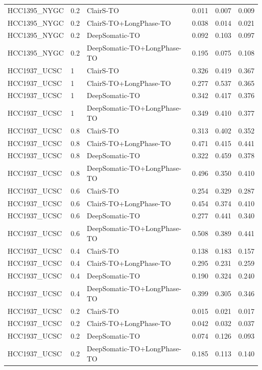 \documentclass[pdflatex,sn-nature]{sn-jnl}
\begin{document}
{\begin{longtable}{@{}lllccc@{}}
  HCC1395\_NYGC & 0.2 & ClairS-TO & 0.011 & 0.007 & 0.009 \\
  HCC1395\_NYGC & 0.2 & ClairS-TO+LongPhase-TO & 0.038 & 0.014 & 0.021 \\
  HCC1395\_NYGC & 0.2 & DeepSomatic-TO & 0.092 & 0.103 & 0.097 \\
  HCC1395\_NYGC & 0.2 & DeepSomatic-TO+LongPhase-TO & 0.195 & 0.075 & 0.108 \\
  HCC1937\_UCSC & 1 & ClairS-TO & 0.326 & 0.419 & 0.367 \\
  HCC1937\_UCSC & 1 & ClairS-TO+LongPhase-TO & 0.277 & 0.537 & 0.365 \\
  HCC1937\_UCSC & 1 & DeepSomatic-TO & 0.342 & 0.417 & 0.376 \\
  HCC1937\_UCSC & 1 & DeepSomatic-TO+LongPhase-TO & 0.349 & 0.410 & 0.377 \\
  HCC1937\_UCSC & 0.8 & ClairS-TO & 0.313 & 0.402 & 0.352 \\
  HCC1937\_UCSC & 0.8 & ClairS-TO+LongPhase-TO & 0.471 & 0.415 & 0.441 \\
  HCC1937\_UCSC & 0.8 & DeepSomatic-TO & 0.322 & 0.459 & 0.378 \\
  HCC1937\_UCSC & 0.8 & DeepSomatic-TO+LongPhase-TO & 0.496 & 0.350 & 0.410 \\
  HCC1937\_UCSC & 0.6 & ClairS-TO & 0.254 & 0.329 & 0.287 \\
  HCC1937\_UCSC & 0.6 & ClairS-TO+LongPhase-TO & 0.454 & 0.374 & 0.410 \\
  HCC1937\_UCSC & 0.6 & DeepSomatic-TO & 0.277 & 0.441 & 0.340 \\
  HCC1937\_UCSC & 0.6 & DeepSomatic-TO+LongPhase-TO & 0.508 & 0.389 & 0.441 \\
  HCC1937\_UCSC & 0.4 & ClairS-TO & 0.138 & 0.183 & 0.157 \\
  HCC1937\_UCSC & 0.4 & ClairS-TO+LongPhase-TO & 0.295 & 0.231 & 0.259 \\
  HCC1937\_UCSC & 0.4 & DeepSomatic-TO & 0.190 & 0.324 & 0.240 \\
  HCC1937\_UCSC & 0.4 & DeepSomatic-TO+LongPhase-TO & 0.399 & 0.305 & 0.346 \\
  HCC1937\_UCSC & 0.2 & ClairS-TO & 0.015 & 0.021 & 0.017 \\
  HCC1937\_UCSC & 0.2 & ClairS-TO+LongPhase-TO & 0.042 & 0.032 & 0.037 \\
  HCC1937\_UCSC & 0.2 & DeepSomatic-TO & 0.074 & 0.126 & 0.093 \\
  HCC1937\_UCSC & 0.2 & DeepSomatic-TO+LongPhase-TO & 0.185 & 0.113 & 0.140 \\

\end{longtable}}
\end{document}
